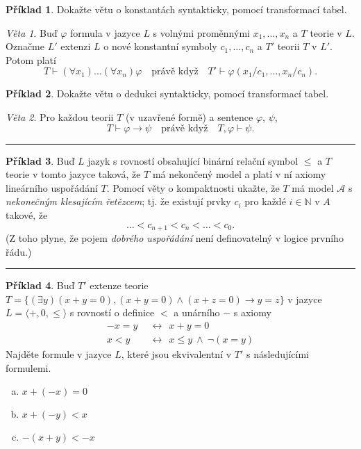 \documentclass{amsart}
\theoremstyle{definition}
\newtheorem{problem}{Příklad}
\theoremstyle{remark}
\newtheorem*{theorem*}{Věta}
\begin{document}
\medskip

\begin{problem} Dokažte větu o konstantách syntakticky, pomocí transformací tabel.

\smallskip

\begin{theorem*} Buď $\varphi$ formula v jazyce $L$ s volnými proměnnými $x_1,\dots,x_n$ a $T$ teorie v $L$. Označme $L'$ extenzi $L$ o nové konstantní symboly $c_1,\dots,c_n$ a $T'$ teorii $T$ v $L'$. Potom platí
$$T \vdash (\forall x_1)\dots(\forall x_n)\varphi \quad\text{právě když}\quad T'\vdash\varphi(x_1/c_1,\dots,x_n/c_n).$$
\end{theorem*}
\end{problem} 

\medskip


\begin{problem} Dokažte větu o dedukci syntakticky, pomocí transformací tabel.

\smallskip

\begin{theorem*} Pro každou teorii $T$ (v uzavřené formě) a sentence $\varphi$, $\psi$,
$$T\vdash \varphi\to\psi\quad\text{právě když}\quad T,\varphi\vdash\psi.$$
\end{theorem*}
\end{problem} 

\medskip
\hrule

\begin{problem} Buď $L$ jazyk s rovností obsahující binární relační symbol $\le$ a $T$ teorie v tomto jazyce taková, že $T$ má nekončený model a platí v ní axiomy lineárního uspořádání $T$. Pomocí věty o kompaktnosti ukažte, že $T$ má model $\mathcal{A}$ s \emph{nekonečným klesajícím řetězcem}; tj. že existují prvky $c_i$ pro každé $i\in \mathbb{N}$ v $A$ takové, že 
    $$\dots < c_{n+1} < c_n< \dots <c_0.$$
    (Z toho plyne, že pojem \emph{dobrého uspořádání} není definovatelný v logice prvního řádu.)
\end{problem}

\medskip
\hrule

\begin{problem}
Buď $T'$ extenze teorie $T=\{(\exists y)(x+y=0),(x+y=0)\wedge (x+z=0)\rightarrow y=z\}$ v jazyce $L=\langle +,0,\le\rangle$ s rovností o definice $<$ a unárního $-$ s axiomy
\begin{align*}
-x=y\ \ &\leftrightarrow\ \ x+y=0\\
x<y\ \ &\leftrightarrow\ \ x\le y\ \wedge\ \neg(x=y)
\end{align*}
Najděte formule v jazyce $L$, které jsou ekvivalentní v $T'$ s následujícími formulemi.
\begin{enumerate}[(a)]
\itemsep6pt
\item $x+(-x)=0$
\item $x+(-y)<x$
\item $-(x+y)<-x$
\end{enumerate}
\end{problem}
\end{document}
